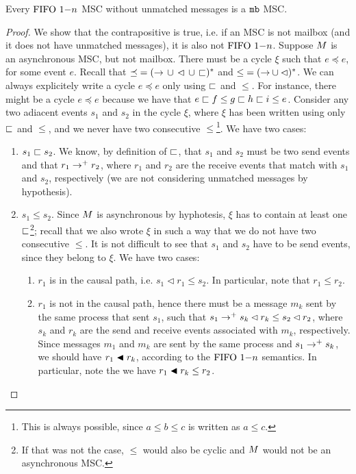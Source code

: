 \begin{proposition} \label{prop:onen_mb_no_unmatched}
	Every $\text{FIFO } 1\mathsf{-}n$ MSC without unmatched messages is a $\mathtt{mb}$ MSC.
\end{proposition}
\begin{proof}
We show that the contrapositive is true, i.e. if an MSC is not mailbox (and it does not have unmatched messages), it is also not $\text{FIFO } 1\mathsf{-}n$. Suppose $M$ is an asynchronous MSC, but not mailbox. There must be a cycle $\xi$ such that  $e \preceq e$, for some event $e$. Recall that ${\preceq} = ({\to} \,\cup\, {\lhd} \,\cup\, {\sqsubset})^\ast$ and ${\le} = ({\to} \cup {\lhd})^\ast$. We can always explicitely write a cycle $e \preceq e$ only using $\sqsubset$ and $\le$. For instance, there might be a cycle $e \preceq e$ because we have that $e \sqsubset f \le g \sqsubset h \sqsubset i \le e$. Consider any two adiacent events $s_1$ and $s_2$ in the cycle $\xi$, where $\xi$ has been written using only $\sqsubset$ and $\le$, and we never have two consecutive $\le$\footnote{This is always possible, since $a \le b \le c$ is written as $a \le c$.}. We have two cases:
\begin{enumerate}
	\item $s_1 \sqsubset s_2$. We know, by definition of $\sqsubset$, that $s_1$ and $s_2$ must be two send events and that $r_1 \to^+ r_2$, where $r_1$ and $r_2$ are the receive events that match with $s_1$ and $s_2$, respectively (we are not considering unmatched messages by hypothesis).
	\item $s_1 \le s_2$. Since $M$ is asynchronous by hyphotesis, $\xi$ has to contain at least one $\sqsubset$\footnote{If that was not the case, $\le$ would also be cyclic and $M$ would not be an asynchronous MSC.}; recall that we also wrote $\xi$ in such a way that we do not have two consecutive $\le$. It is not difficult to see that $s_1$ and $s_2$ have to be send events, since they belong to $\xi$. We have two cases:
	\begin{enumerate}
		\item $r_1$ is in the causal path, i.e. $s_1 \lhd r_1 \le s_2$. In particular, note that $r_1 \le r_2$.
		\item $r_1$ is not in the causal path, hence there must be a message $m_k$ sent by the same process that sent $s_1$, such that $s_1 \to^+ s_k \lhd r_k \le s_2 \lhd r_2$, where $s_k$ and $r_k$ are the send and receive events associated with $m_k$, respectively. Since messages $m_1$ and $m_k$ are sent by the same process and $s_1 \to^+ s_k$, we should have $r_1 \blacktriangleleft r_k$, according to the $\text{FIFO } 1\mathsf{-}n$ semantics. In particular, note the we have $r_1 \blacktriangleleft r_k \le r_2$.

\end{enumerate}
\end{enumerate}
\end{proof}

